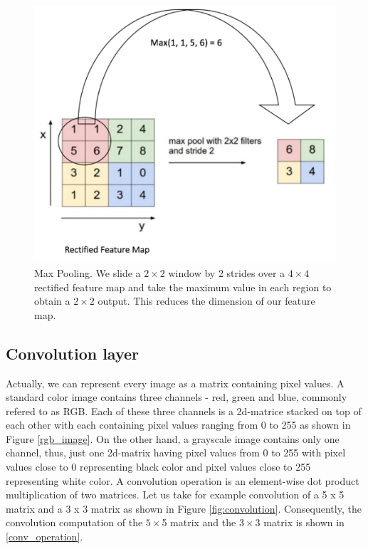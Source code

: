 \documentclass[master]{thesis-uestc}
\begin{document}
\begin{figure}[ht]
\includegraphics[width=5in]{pic/pooling.png}
\caption{Max Pooling. We slide a $2 \times 2$ window by 2 strides over a $4 \times 4$ rectified feature map and take the maximum value in each region to obtain a $2 \times 2$ output. This reduces the dimension of our feature map.}
\label{fig_maxpooling}
\end{figure}

\subsection{Convolution layer}
Actually, we can represent every image as a matrix containing pixel values. A standard color image contains three channels - red, green and blue, commonly refered to as RGB. Each of these three channels is a 2d-matrice stacked on top of each other with each containing pixel values ranging from 0 to 255 as shown in Figure \ref{rgb_image}. On the other hand, a grayscale image contains only one channel, thus, just one 2d-matrix having pixel values from 0 to 255 with pixel values close to 0 representing black color and pixel values close to 255 representing white color. A convolution operation is an element-wise dot product multiplication of two matrices. Let us take for example convolution of a 5 x 5 matrix and a 3 x 3 matrix as shown in Figure \ref{fig:convolution}. Consequently, the convolution computation of the $5 \times $5 matrix and the $3 \times $3 matrix is shown in \ref{conv_operation}.
\end{document}

